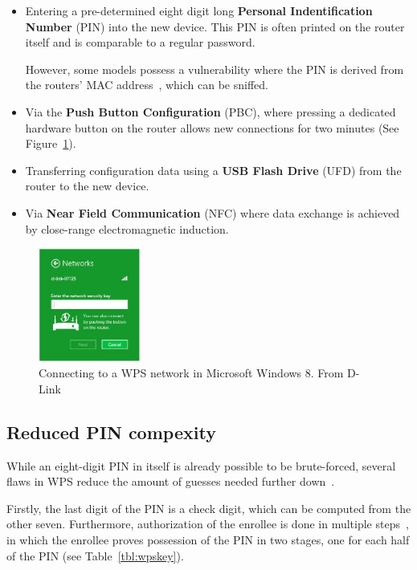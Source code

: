 \begin{itemize}

\item{Entering a pre-determined eight digit long \textbf{Personal Indentification Number} (PIN) into the new device. This PIN is often printed on the router itself and is comparable to a regular password. 

However, some models possess a vulnerability where the PIN is derived from the routers' MAC address~\cite{Craig14}, which can be sniffed.}

\item{Via the \textbf{Push Button Configuration} (PBC), where pressing a dedicated hardware button on the router allows new connections for two minutes (See Figure~\ref{fig:wpsbutton}). }

\item{Transferring configuration data using a \textbf{USB Flash Drive} (UFD) from the router to the new device.}

\item{Via \textbf{Near Field Communication} (NFC) where data exchange is achieved by close-range electromagnetic induction.}

\end{itemize}

\begin{figure} %
\includegraphics[width=0.3\textwidth]{src/img/DIR-890L-WPS-Button-windows-8c.jpg}
\caption{Connecting to a WPS network in Microsoft Windows 8. From D-Link~\cite{DLink14}}\label{fig:wpsbutton}
\end{figure}

\subsection{Reduced PIN compexity}\label{sec:wpsredpin}

While an eight-digit PIN in itself is already possible to be brute-forced, several flaws in WPS reduce the amount of guesses needed further down~\cite{Ducklin15}. 

Firstly, the last digit of the PIN is a check digit, which can be computed from the other seven. Furthermore, authorization of the enrollee is done in multiple steps~\cite{WiFi06}, in which the enrollee proves possession of the PIN in two stages, one for each half of the PIN (see Table~\ref{tbl:wpskey}).

